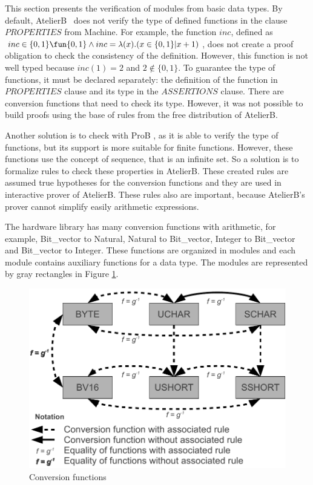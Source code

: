 

This section presents the verification of modules from basic data types.
By default, AtelierB~\cite{atelierB} does not verify the type of defined functions in the clause $PROPERTIES$ from Machine. For example, the function $inc$, defined as $inc \in \{0,1\} \fun \{0,1\} \land inc = \lambda(x).( x \in \{0,1\} | x + 1)$, does not create a proof obligation to check the consistency of the definition. However, this function is not well typed because $inc(1)=2$ and $ 2 \not\in \{0,1\}$. To guarantee the type of functions, it must be declared separately: the definition of the function in $PROPERTIES$ clause and its type in the $ASSERTIONS$ clause. There are conversion functions that need to check its type. 
However, it was not possible to build proofs using the base of rules from the free distribution of AtelierB.


Another solution is to check with ProB \cite{proB}, as it is able to verify the type of functions, but its support is more suitable for finite functions. However, these functions use the concept of sequence, that is an infinite set. So a solution is to formalize rules to check these properties in AtelierB.
These created rules are assumed true hypotheses for the conversion functions and they are used in interactive prover of AtelierB. These rules also are important, because  AtelierB's prover cannot simplify easily arithmetic expressions.

The hardware library has many conversion functions with arithmetic, for example, Bit\_vector to Natural, Natural to Bit\_vector, Integer to Bit\_vector and Bit\_vector to Integer. These functions are organized in modules and each module contains auxiliary functions for a data type. The modules are represented by gray rectangles in Figure \ref{DiagramTypesRules}. %

\begin{figure}[he]
\centering
\includegraphics[width=3.in]{images/Diagram_Types_and_Rules.pdf}
\caption{Conversion functions}
\label{DiagramTypesRules}
\end{figure}


